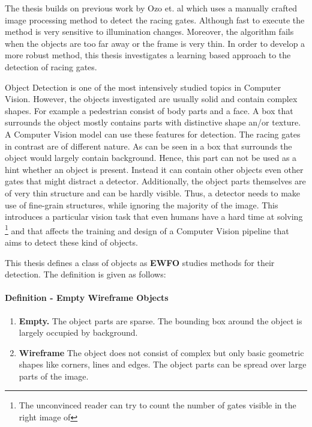 The thesis builds on previous work by Ozo et. al  which uses a manually crafted image processing method to detect the racing gates. Although fast to execute the method is very sensitive to illumination changes. Moreover, the algorithm fails when the objects are too far away or the frame is very thin. In order to develop a more robust method, this thesis investigates a learning based approach to the detection of racing gates.

Object Detection is one of the most intensively studied topics in Computer Vision. However, the objects investigated are usually solid and contain complex shapes. For example a pedestrian consist of body parts and a face. A box that surrounds the object mostly contains parts with distinctive shape an/or texture. A Computer Vision model can use these features for detection. The racing gates in contrast are of different nature. As can be seen in  a box that surrounds the object would largely contain background. Hence, this part can not be used as a hint whether an object is present. Instead it can contain other objects even other gates that might distract a detector. Additionally, the object parts themselves are of very thin structure and can be hardly visible. Thus, a detector needs to make use of fine-grain structures, while ignoring the majority of the image. This introduces a particular vision task that even humans have a hard time at solving \footnote{The unconvinced reader can try to count the number of gates visible in the right image of } and that affects the training and design of a Computer Vision pipeline that aims to detect these kind of objects.

This thesis defines a class of objects as \textbf{\ac{EWFO}} studies methods for their detection. The definition is given as follows:

\paragraph{Definition - Empty Wireframe Objects}	
\begin{enumerate}
	\item \textbf{Empty.} The object parts are sparse. The bounding box around the object is largely occupied by background.
	\item \textbf{Wireframe} The object does not consist of complex but only basic geometric shapes like corners, lines and edges. The object parts can be spread over large parts of the image.

\end{enumerate}

